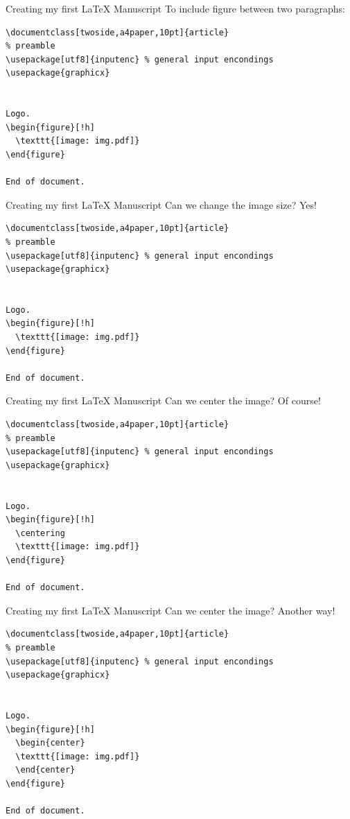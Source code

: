 \begin{frame}[fragile]{Creating my first \LaTeX{} Manuscript}
To include figure between two paragraphs:
\footnotesize
\begin{verbatim}
\documentclass[twoside,a4paper,10pt]{article}
% preamble
\usepackage[utf8]{inputenc} % general input encondings
\usepackage{graphicx}


Logo.
\begin{figure}[!h] 
  \texttt{[image: img.pdf]}
\end{figure}

End of document.

\end{verbatim}
\end{frame}


\begin{frame}[fragile]{Creating my first \LaTeX{} Manuscript}
Can we change the image size? Yes!
\footnotesize
\begin{verbatim}
\documentclass[twoside,a4paper,10pt]{article}
% preamble
\usepackage[utf8]{inputenc} % general input encondings
\usepackage{graphicx}


Logo.
\begin{figure}[!h] 
  \texttt{[image: img.pdf]}
\end{figure}

End of document.

\end{verbatim}
\end{frame}

\begin{frame}[fragile]{Creating my first \LaTeX{} Manuscript}
Can we center the image? Of course!
\footnotesize
\begin{verbatim}
\documentclass[twoside,a4paper,10pt]{article}
% preamble
\usepackage[utf8]{inputenc} % general input encondings
\usepackage{graphicx}


Logo.
\begin{figure}[!h] 
  \centering
  \texttt{[image: img.pdf]}
\end{figure}

End of document.

\end{verbatim}
\end{frame}

\begin{frame}[fragile]{Creating my first \LaTeX{} Manuscript}
Can we center the image? Another way!
\footnotesize
\begin{verbatim}
\documentclass[twoside,a4paper,10pt]{article}
% preamble
\usepackage[utf8]{inputenc} % general input encondings
\usepackage{graphicx}


Logo.
\begin{figure}[!h] 
  \begin{center}
  \texttt{[image: img.pdf]}
  \end{center}
\end{figure}

End of document.

\end{verbatim}
\end{frame}

